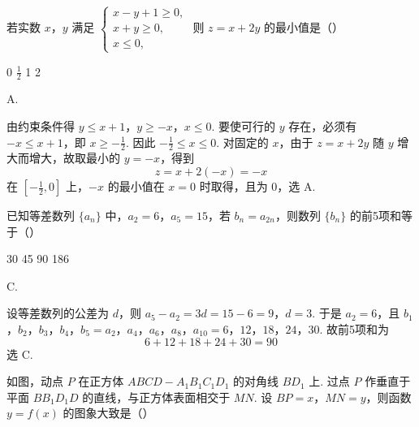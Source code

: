 \begin{problem}
若实数 \(x\)，\(y\) 满足 \(\begin{cases}
x - y + 1 \geqslant 0,\\
x + y \geqslant 0,\\
x \leqslant 0,
\end{cases}\) 则 \(z = x + 2y\) 的最小值是（\quad）

\choices
    {0}
    {\(\frac{1}{2}\)}
    {1}
    {2}
\end{problem}

\begin{answer}
A.
\end{answer}

\begin{solution}
由约束条件得
\(y\leqslant x+1\)，\(y\geqslant-x\)，\(x\leqslant0\).
要使可行的 \(y\) 存在，必须有 \(-x\leqslant x+1\)，即 \(x\geqslant-\frac12\). 因此
\(-\frac12\leqslant x\leqslant0\). 对固定的 \(x\)，由于 \(z=x+2y\) 随 \(y\) 增大而增大，故取最小的 \(y=-x\)，得到
\[
z=x+2(-x)=-x
\]
在 \([-\frac12,0]\) 上，\(-x\) 的最小值在 \(x=0\) 时取得，且为 \(0\)，选 A.
\end{solution}

\begin{problem}
已知等差数列 \(\{a_{n}\}\) 中，\(a_{2} = 6\)，\(a_{5} = 15\)，若 \(b_{n} = a_{2n}\)，则数列 \(\{b_{n}\}\) 的前5项和等于（\quad）

\choices
    {30}
    {45}
    {90}
    {186}
\end{problem}

\begin{answer}
C.
\end{answer}

\begin{solution}
设等差数列的公差为 \(d\)，则
\(a_5-a_2=3d=15-6=9\)，\(d=3\).
于是 \(a_2=6\)，且
\(b_1\)，\(b_2\)，\(b_3\)，\(b_4\)，\(b_5=a_2\)，\(a_4\)，\(a_6\)，\(a_8\)，\(a_{10}=6\)，\(12\)，\(18\)，\(24\)，\(30\).
故前5项和为
\[
6+12+18+24+30=90
\]
选 C.
\end{solution}

\begin{problem}
如图，动点 \(P\) 在正方体 \(ABCD - A_{1}B_{1}C_{1}D_{1}\) 的对角线 \(BD_{1}\) 上. 过点 \(P\) 作垂直于平面 \(BB_{1}D_{1}D\) 的直线，与正方体表面相交于 \(MN\). 设 \(BP = x\)，\(MN = y\)，则函数 \(y = f(x)\) 的图象大致是（\quad）


\choices
    {}
    {}
    {}
    {}
\end{problem}

